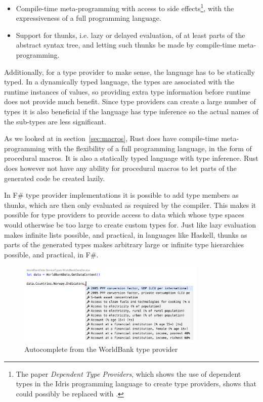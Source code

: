 \begin{itemize}
  \item Compile-time meta-programming with access to side effects\footnote{The paper \emph{Dependent Type Providers}\cite{dependent-type-providers}, which shows the use of dependent types in the Idris programming language to create type providers, shows that  could possibly be replaced with .}, with the expressiveness of a full programming language.
  \item Support for thunks, i.e. lazy or delayed evaluation, of at least parts of the abstract syntax tree, and letting such thunks be made by compile-time meta-programming.
\end{itemize}

Additionally, for a type provider to make sense, the language has to be statically typed. In a dynamically typed language, the types are associated with the runtime instances of values, so providing extra type information before runtime does not provide much benefit. Since type providers can create a large number of types it is also beneficial if the language has type inference so the actual names of the sub-types are less significant.

As we looked at in section~\ref{sec:macros}, Rust does have compile-time meta-programming with the flexibility of a full programming language, in the form of procedural macros. It is also a statically typed language with type inference. Rust does however not have any ability for procedural macros to let parts of the generated code be created lazily.

In F\# type provider implementations it is possible to add type members as thunks, which are then only evaluated as required by the compiler. This makes it possible for type providers to provide access to data which whose type spaces would otherwise be too large to create custom types for. Just like lazy evaluation makes infinite lists possible, and practical, in languages like Haskell, thunks as parts of the generated types makes arbitrary large or infinite type hierarchies possible, and practical, in F\#.

\begin{figure}[ht!]
\begin{center}
\includegraphics[width=0.8\textwidth]{worldbank_autocomplete}
\end{center}
\hspace*{-1.5in} %
\caption{Autocomplete from the WorldBank type provider}
\label{fig:worldbank-autocomplete}
\end{figure}

